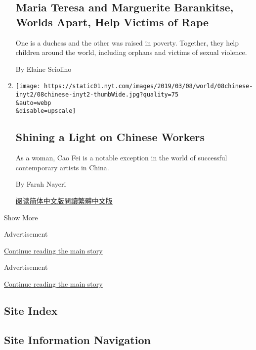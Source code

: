 \begin{enumerate}
  \hypertarget{maria-teresa-and-marguerite-barankitse-worlds-apart-help-victims-of-rape}{%
  \subsection{Maria Teresa and Marguerite Barankitse, Worlds Apart, Help
  Victims of
  Rape}\label{maria-teresa-and-marguerite-barankitse-worlds-apart-help-victims-of-rape}}

  One is a duchess and the other was raised in poverty. Together, they
  help children around the world, including orphans and victims of
  sexual violence.

  By Elaine Sciolino
\item
  \href{/2019/03/08/arts/cao-fei-china-woman-artist.html}{}

  \texttt{[image: https://static01.nyt.com/images/2019/03/08/world/08chinese-inyt2/08chinese-inyt2-thumbWide.jpg?quality=75\\\&auto=webp\\\&disable=upscale]}

  \hypertarget{shining-a-light-on-chinese-workers}{%
  \subsection{Shining a Light on Chinese
  Workers}\label{shining-a-light-on-chinese-workers}}

  As a woman, Cao Fei is a notable exception in the world of successful
  contemporary artists in China.

  By Farah Nayeri

  \href{https://cn.nytimes.com/culture/20190313/cao-fei-china-woman-artist/}{阅读简体中文版}\href{https://cn.nytimes.com/culture/20190313/cao-fei-china-woman-artist/zh-hant/}{閱讀繁體中文版}
\end{enumerate}

Show More

Advertisement

\protect\hyperlink{after-mid2}{Continue reading the main story}

Advertisement

\protect\hyperlink{after-mktg}{Continue reading the main story}

\hypertarget{site-index}{%
\subsection{Site Index}\label{site-index}}

\hypertarget{site-information-navigation}{%
\subsection{Site Information
Navigation}\label{site-information-navigation}}

